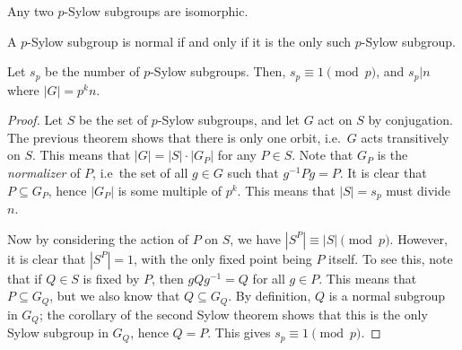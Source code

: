 \documentclass[11pt]{article}
\theoremstyle{definition}
\theoremstyle{remark}
\numberwithin{equation}{section}
\begin{document}
    \begin{corollary}
        Any two $p$-Sylow subgroups are isomorphic.
    \end{corollary}
    \begin{corollary}
        A $p$-Sylow subgroup is normal if and only if it is the only such $p$-Sylow
        subgroup.
    \end{corollary}
    
    \begin{theorem}
        Let $s_p$ be the number of $p$-Sylow subgroups. Then, $s_p \equiv 1
        \pmod{p}$, and $s_p | n$ where $|G| = p^k n$.
    \end{theorem}
    \begin{proof}
        Let $S$ be the set of $p$-Sylow subgroups, and let $G$ act on $S$ by
        conjugation. The previous theorem shows that there is only one orbit, i.e.\
        $G$ acts transitively on $S$. This means that $|G| = |S|\cdot |G_P|$ for any $P
        \in S$. Note that $G_P$ is the \emph{normalizer} of $P$, i.e\ the set of all
        $g \in G$ such that $g^{-1}Pg = P$. It is clear that $P \subseteq G_P$, hence
        $|G_P|$ is some multiple of $p^k$. This means that $|S| = s_p$ must divide
        $n$.

        Now by considering the action of $P$ on $S$, we have $|S^P| \equiv |S|
        \pmod{p}$. However, it is clear that $|S^P| = 1$, with the only fixed point
        being $P$ itself. To see this, note that if $Q \in S$ is fixed by $P$, then
        $gQg^{-1} = Q$ for all $g \in P$. This means that $P \subseteq G_Q$, but we
        also know that $Q \subseteq G_Q$. By definition, $Q$ is a normal subgroup in
        $G_Q$; the corollary of the second Sylow theorem shows that this is the only
        Sylow subgroup in $G_Q$, hence $Q = P$. This gives $s_p \equiv 1 \pmod{p}$.
    \end{proof}
\end{document}
